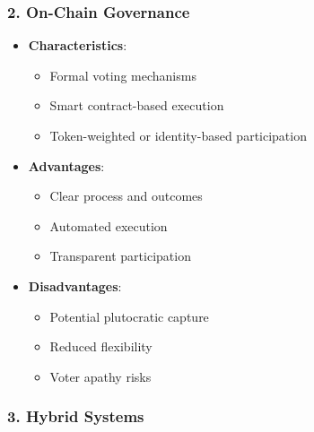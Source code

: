 \documentclass[
  letterpaper,
  DIV=11,
  numbers=noendperiod]{scrreprt}
\providecommand{\tightlist}{%
  \setlength{\itemsep}{0pt}\setlength{\parskip}{0pt}}\usepackage{longtable,booktabs,array}
\begin{document}
\subsubsection{2. On-Chain Governance}\label{on-chain-governance}

\begin{itemize}
\tightlist
\item
  \textbf{Characteristics}:

  \begin{itemize}
  \tightlist
  \item
    Formal voting mechanisms
  \item
    Smart contract-based execution
  \item
    Token-weighted or identity-based participation
  \end{itemize}
\item
  \textbf{Advantages}:

  \begin{itemize}
  \tightlist
  \item
    Clear process and outcomes
  \item
    Automated execution
  \item
    Transparent participation
  \end{itemize}
\item
  \textbf{Disadvantages}:

  \begin{itemize}
  \tightlist
  \item
    Potential plutocratic capture
  \item
    Reduced flexibility
  \item
    Voter apathy risks
  \end{itemize}
\end{itemize}

\subsubsection{3. Hybrid Systems}\label{hybrid-systems}
\end{document}
